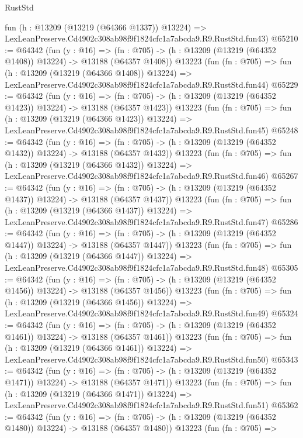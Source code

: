 \begin{lexlean}{RustStd}
\begin{coremodule}
    fun (h : @13209 (@13219 (@64366 @1337)) @13224) =>
    LexLeanPreserve.Cd4902c308ab98f9f1824cfc1a7abcda9.R9.RustStd.fun43)
@65210 := @64342
    (fun (y : @16) =>
    (fn : @705) -> (h : @13209 (@13219 (@64352 @1408)) @13224) -> @13188 (@64357 @1408))
    @13223
    (fun (fn : @705) =>
    fun (h : @13209 (@13219 (@64366 @1408)) @13224) =>
    LexLeanPreserve.Cd4902c308ab98f9f1824cfc1a7abcda9.R9.RustStd.fun44)
@65229 := @64342
    (fun (y : @16) =>
    (fn : @705) -> (h : @13209 (@13219 (@64352 @1423)) @13224) -> @13188 (@64357 @1423))
    @13223
    (fun (fn : @705) =>
    fun (h : @13209 (@13219 (@64366 @1423)) @13224) =>
    LexLeanPreserve.Cd4902c308ab98f9f1824cfc1a7abcda9.R9.RustStd.fun45)
@65248 := @64342
    (fun (y : @16) =>
    (fn : @705) -> (h : @13209 (@13219 (@64352 @1432)) @13224) -> @13188 (@64357 @1432))
    @13223
    (fun (fn : @705) =>
    fun (h : @13209 (@13219 (@64366 @1432)) @13224) =>
    LexLeanPreserve.Cd4902c308ab98f9f1824cfc1a7abcda9.R9.RustStd.fun46)
@65267 := @64342
    (fun (y : @16) =>
    (fn : @705) -> (h : @13209 (@13219 (@64352 @1437)) @13224) -> @13188 (@64357 @1437))
    @13223
    (fun (fn : @705) =>
    fun (h : @13209 (@13219 (@64366 @1437)) @13224) =>
    LexLeanPreserve.Cd4902c308ab98f9f1824cfc1a7abcda9.R9.RustStd.fun47)
@65286 := @64342
    (fun (y : @16) =>
    (fn : @705) -> (h : @13209 (@13219 (@64352 @1447)) @13224) -> @13188 (@64357 @1447))
    @13223
    (fun (fn : @705) =>
    fun (h : @13209 (@13219 (@64366 @1447)) @13224) =>
    LexLeanPreserve.Cd4902c308ab98f9f1824cfc1a7abcda9.R9.RustStd.fun48)
@65305 := @64342
    (fun (y : @16) =>
    (fn : @705) -> (h : @13209 (@13219 (@64352 @1456)) @13224) -> @13188 (@64357 @1456))
    @13223
    (fun (fn : @705) =>
    fun (h : @13209 (@13219 (@64366 @1456)) @13224) =>
    LexLeanPreserve.Cd4902c308ab98f9f1824cfc1a7abcda9.R9.RustStd.fun49)
@65324 := @64342
    (fun (y : @16) =>
    (fn : @705) -> (h : @13209 (@13219 (@64352 @1461)) @13224) -> @13188 (@64357 @1461))
    @13223
    (fun (fn : @705) =>
    fun (h : @13209 (@13219 (@64366 @1461)) @13224) =>
    LexLeanPreserve.Cd4902c308ab98f9f1824cfc1a7abcda9.R9.RustStd.fun50)
@65343 := @64342
    (fun (y : @16) =>
    (fn : @705) -> (h : @13209 (@13219 (@64352 @1471)) @13224) -> @13188 (@64357 @1471))
    @13223
    (fun (fn : @705) =>
    fun (h : @13209 (@13219 (@64366 @1471)) @13224) =>
    LexLeanPreserve.Cd4902c308ab98f9f1824cfc1a7abcda9.R9.RustStd.fun51)
@65362 := @64342
    (fun (y : @16) =>
    (fn : @705) -> (h : @13209 (@13219 (@64352 @1480)) @13224) -> @13188 (@64357 @1480))
    @13223
    (fun (fn : @705) =>

\end{coremodule}
\end{lexlean}
